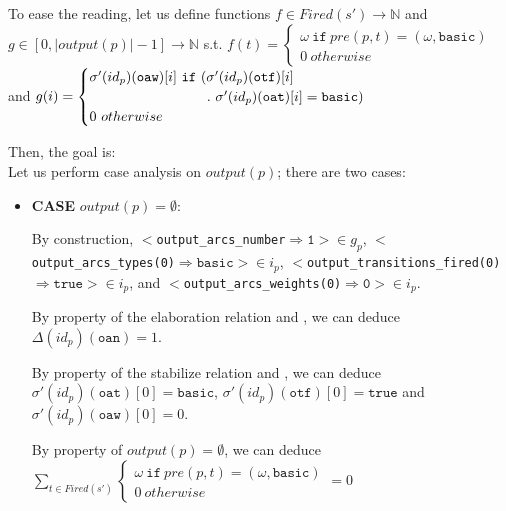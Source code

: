 \documentclass[dvipsnames,12pt]{article}
\begin{document}
\begin{niproof}
 \noindent{}To ease the reading, let us define functions
 $f\in{}Fired(s')\rightarrow\mathbb{N}$ and
 $g\in[0,\vert{}output(p)\vert-1]\rightarrow\mathbb{N}$ s.t.
 $f(t)=\begin{cases}
   \omega~\mathtt{if}~pre(p,t)=(\omega,\mathtt{basic}) \\
   0~otherwise
 \end{cases}$\\ and $g(i)=\begin{cases}
   \sigma'(id_p)(\texttt{oaw})[i]~\mathtt{if}~(\sigma'(id_p)(\texttt{otf})[i]~ \\
   \hspace{19.5ex}.~\sigma'(id_p)(\texttt{oat})[i]=\mathtt{basic}) \\
   0~otherwise \\
 \end{cases}$

 \noindent{}Then, the goal is: \\

 \noindent{}Let us perform case analysis on $output(p)$; there are two cases:

 \begin{itemize}
 \item \textbf{CASE} $output(p)=\emptyset$:
   
   By construction,
   ${<}$\texttt{output\_arcs\_number}$\mathtt{\Rightarrow{}1}{>}\in{}g_p$,
   ${<}$\texttt{output\_arcs\_types(0)}$\Rightarrow{}\mathtt{basic}{>}\in{}i_p$,
   ${<}$\texttt{output\_transitions\_fired(0)}$\Rightarrow{}\mathtt{true}{>}\in{}i_p$,
   and
   ${<}$\texttt{output\_arcs\_weights(0)}$\mathtt{\Rightarrow{}0}{>}\in{}i_p$.

   By property of the elaboration relation and \InCsCompP, we can
   deduce $\Delta(id_p)(\texttt{oan})=1$.

   By property of the stabilize relation and \InCsCompP, we can deduce
   $\sigma'(id_p)(\texttt{oat})[0]=\mathtt{basic}$,
   $\sigma'(id_p)(\texttt{otf})[0]=\mathtt{true}$ and
   $\sigma'(id_p)(\texttt{oaw})[0]=0$.

   By property of $output(p)=\emptyset$, we can deduce\\
   $\sum\limits_{t\in{}Fired(s')}
   \begin{cases}
     \omega~\mathtt{if}~pre(p,t)=(\omega,\mathtt{basic}) \\
     0~otherwise
   \end{cases}=0$


\end{itemize}
\end{niproof}
\end{document}
